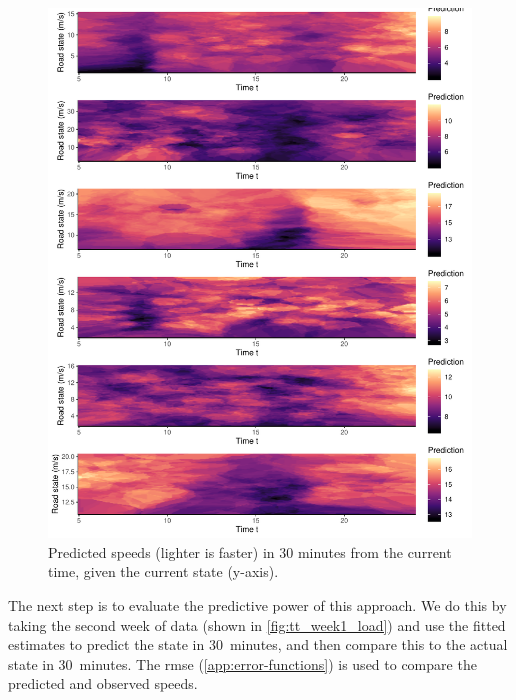 \begin{knitrout}\small
{}\color{fgcolor}\begin{figure}

{\centering \includegraphics[width=\linewidth]{figure/tt_week0_grid-1} 

}

\caption[Predicted speeds (lighter is faster) in 30 minutes from the current time, given the current state (y-axis)]{Predicted speeds (lighter is faster) in 30 minutes from the current time, given the current state (y-axis).}\label{fig:tt_week0_grid}
\end{figure}


\end{knitrout}

The next step is to evaluate the predictive power of this approach. We do this by taking the second week of data (shown in \cref{fig:tt_week1_load}) and use the fitted estimates to predict the state in 30~minutes, and then compare this to the actual state in 30~minutes. The \gls{rmse} (\cref{app:error-functions}) is used to compare the predicted and observed speeds.



